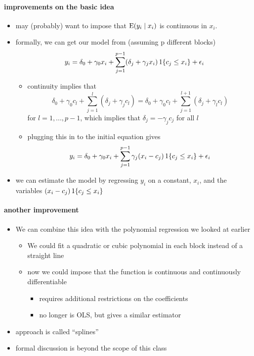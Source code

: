 \paragraph{improvements on the basic idea}
\begin{itemize}
\item may (probably) want to impose that $\operatorname{E}(y_i \mid x_i)$ is
         continuous in $x_i$.
\item formally, we can get our model from (assuming p different blocks)
  \[
  y_i = \delta_0 + \gamma_0 x_i + \sum_{j=1}^{p-1} (\delta_j + \gamma_j x_i) \operatorname{1}\{c_j \leq x_i\} + \epsilon_i
  \]
\begin{itemize}
\item continuity implies that
  \[ \delta_0 + \gamma_0 c_l + \sum_{j=1}^l (\delta_j + \gamma_j c_l) = \delta_0 + \gamma_0 c_l +
  \sum_{j=1}^{l+1} (\delta_j + \gamma_l c_l)\] for $l = 1,...,p-1$, which implies
  that $\delta_j = - \gamma_j c_j$ for all $l$
\item plugging this in to the initial equation gives
  \[
  y_i = \delta_0 + \gamma_0 x_i + \sum_{j=1}^{p-1} \gamma_j(x_i-c_j) \operatorname{1}\{c_j \leq x_i\} + \epsilon_i
  \]
\end{itemize}
\item we can estimate the model by regressing $y_i$ on a constant,
  $x_i$, and the variables $(x_i - c_j) \operatorname{1}\{c_j \leq x_i\}$
\end{itemize}

\paragraph{another improvement}
\begin{itemize}
\item We can combine this idea with the polynomial regression we
         looked at earlier
\begin{itemize}
\item We could fit a quadratic or cubic polynomial in each block
           instead of a straight line
\item now we could impose that the function is continuous and
           continuously differentiable
\begin{itemize}
\item requires additional restrictions on the coefficients
\item no longer is OLS, but gives a similar estimator
\end{itemize}
\end{itemize}
\item approach is called ``splines''
\item formal discussion is beyond the scope of this class
\end{itemize}

